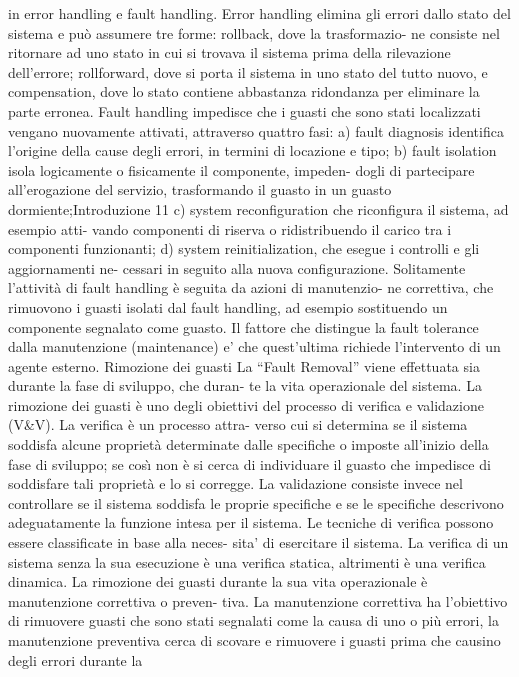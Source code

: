 \documentclass[14pt]{extarticle}
\begin{document}
in error handling e fault handling. Error handling elimina gli errori dallo
stato del sistema e può assumere tre forme: rollback, dove la trasformazio-
ne consiste nel ritornare ad uno stato in cui si trovava il sistema prima della
rilevazione dell’errore; rollforward, dove si porta il sistema in uno stato del
tutto nuovo, e compensation, dove lo stato contiene abbastanza ridondanza
per eliminare la parte erronea. Fault handling impedisce che i guasti che sono
stati localizzati vengano nuovamente attivati, attraverso quattro fasi:
a) fault diagnosis identifica l’origine della cause degli errori, in termini di
locazione e tipo;
b) fault isolation isola logicamente o fisicamente il componente, impeden-
dogli di partecipare all’erogazione del servizio, trasformando il guasto in
un guasto dormiente;Introduzione
11
c) system reconfiguration che riconfigura il sistema, ad esempio atti-
vando componenti di riserva o ridistribuendo il carico tra i componenti
funzionanti;
d) system reinitialization, che esegue i controlli e gli aggiornamenti ne-
cessari in seguito alla nuova configurazione.
Solitamente l’attività di fault handling è seguita da azioni di manutenzio-
ne correttiva, che rimuovono i guasti isolati dal fault handling, ad esempio
sostituendo un componente segnalato come guasto. Il fattore che distingue la
fault tolerance dalla manutenzione (maintenance) e’ che quest’ultima richiede
l’intervento di un agente esterno.
Rimozione dei guasti
La “Fault Removal” viene effettuata sia durante la fase di sviluppo, che duran-
te la vita operazionale del sistema. La rimozione dei guasti è uno degli obiettivi
del processo di verifica e validazione (V&V). La verifica è un processo attra-
verso cui si determina se il sistema soddisfa alcune proprietà determinate dalle
specifiche o imposte all’inizio della fase di sviluppo; se cosı̀ non è si cerca di
individuare il guasto che impedisce di soddisfare tali proprietà e lo si corregge.
La validazione consiste invece nel controllare se il sistema soddisfa le proprie
specifiche e se le specifiche descrivono adeguatamente la funzione intesa per il
sistema. Le tecniche di verifica possono essere classificate in base alla neces-
sita’ di esercitare il sistema. La verifica di un sistema senza la sua esecuzione
è una verifica statica, altrimenti è una verifica dinamica. La rimozione dei
guasti durante la sua vita operazionale è manutenzione correttiva o preven-
tiva. La manutenzione correttiva ha l’obiettivo di rimuovere guasti che sono
stati segnalati come la causa di uno o più errori, la manutenzione preventiva
cerca di scovare e rimuovere i guasti prima che causino degli errori durante la
\end{document}
